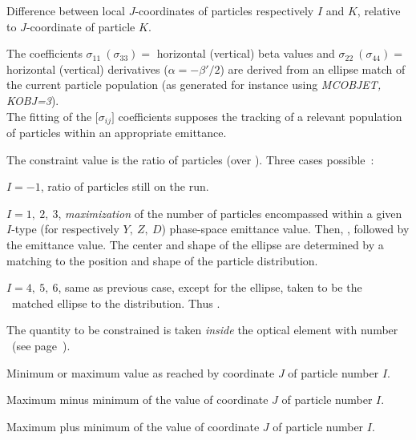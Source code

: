 {\smallskip

 Difference between local $J$-coordinates of particles respectively 
 $I$ and $K$, relative to $J$-coordinate of particle $K$.

\smallskip

 The coefficients 
$ \sigma_{11}~(\sigma_{ 33}) = $ horizontal (vertical) beta values and 
$ \sigma_{ 22}~(\sigma_{ 44}) = $ horizontal (vertical) derivatives ($\alpha = -\beta'/2$) 
are derived from an ellipse match of the current particle population (as generated for instance using 
\textsl{MCOBJET, KOBJ=3}).\\
%
The fitting of the $ \lbrack \sigma_{ij}\rbrack $ 
coefficients supposes the tracking of a relevant population of particles within an 
appropriate emittance.  

\smallskip

 The constraint value  is the ratio of particles (over \IMAX). Three cases possible~: 

     $I=-1$,  ratio of particles still on the run. 

    $I =1, ~ 2, ~ 3$,   \textsl{maximization} of the number of particles 
 encompassed within a given $I$-type 
(for respectively $Y,~Z,~D$) phase-space emittance value. Then, , followed by the emittance value. 
The center and shape of the ellipse are  
 determined by a  matching to  the position and shape of the particle distribution. 

     $I =4, ~ 5, ~ 6$,  same as previous case, except for the ellipse, taken to be the \rms\ matched ellipse 
to the distribution. Thus .

\smallskip

 The quantity to be constrained is 
taken  \textsl{inside } the optical element with number \IR\ (see page~\pageref{RefIR}). 

\smallskip

 Minimum or maximum value as reached by coordinate $J$ of particle number $I$. 

\smallskip

 Maximum minus minimum of the value of coordinate $J$ of particle number $I$. 

\smallskip

 Maximum plus minimum of the value of coordinate $J$ of particle number $I$. 

}
